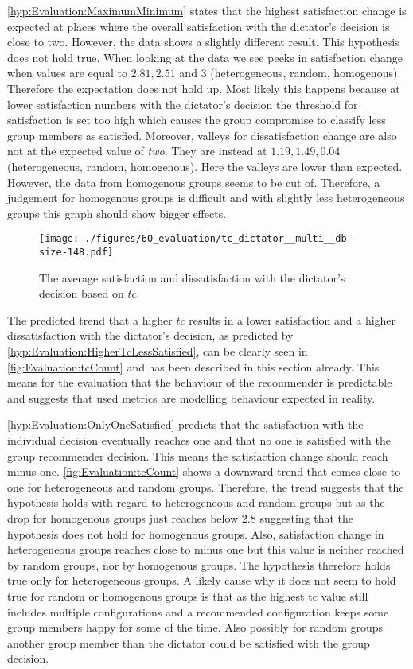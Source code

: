 \autoref{hyp:Evaluation:MaximumMinimum} states that the highest satisfaction change is expected at places where the overall satisfaction with the dictator's decision is close to two. However, the data shows a slightly different result. This hypothesis does not hold true. When looking at the data we see peeks in satisfaction change when values are equal to $2.81, 2.51$ and $3$ (heterogeneous, random, homogenous). Therefore the expectation does not hold up. Most likely this happens because at lower satisfaction numbers with the dictator's decision the threshold for satisfaction is set too high which causes the group compromise to classify less group members as satisfied. Moreover, valleys for dissatisfaction change are also not at the expected value of \textit{two}. They are instead at $1.19, 1.49, 0.04$ (heterogeneous, random, homogenous). Here the valleys are lower than expected. However, the data from homogenous groups seems to be cut of. Therefore, a judgement for homogenous groups is difficult and with slightly less heterogeneous groups this graph should show bigger effects.

\begin{figure}
    \centering
    \texttt{[image: ./figures/60\_evaluation/tc\_dictator\_\_multi\_\_db-size-148.pdf]}
    \caption{The average satisfaction and dissatisfaction with the dictator's decision based on $tc$.}
    \label{fig:Evaluation:tcCount}
\end{figure}

The predicted trend that a higher $tc$ results in a lower satisfaction and a higher dissatisfaction with the dictator's decision, as predicted by \autoref{hyp:Evaluation:HigherTcLessSatisfied}, can be clearly seen in \autoref{fig:Evaluation:tcCount} and has been described in this section already. This means for the evaluation that the behaviour of the recommender is predictable and suggests that used metrics are modelling behaviour expected in reality.

\autoref{hyp:Evaluation:OnlyOneSatisfied} predicts that the satisfaction with the individual decision eventually reaches one and that no one is satisfied with the group recommender decision. This means the satisfaction change should reach minus one. \autoref{fig:Evaluation:tcCount} shows a downward trend that comes close to one for heterogeneous and random groups. Therefore, the trend suggests that the hypothesis holds with regard to heterogeneous and random groups but as the drop for homogenous groups just reaches below $2.8$ suggesting that the hypothesis does not hold for homogenous groups. Also, satisfaction change in heterogeneous groups reaches close to minus one but this value is neither reached by random groups, nor by homogenous groups. The hypothesis therefore holds true only for heterogeneous groups. A likely cause why it does not seem to hold true for random or homogenous groups is that as the highest tc value still includes multiple configurations and a recommended configuration keeps some group members happy for some of the time. Also possibly for random groups another group member than the dictator could be satisfied with the group decision.

